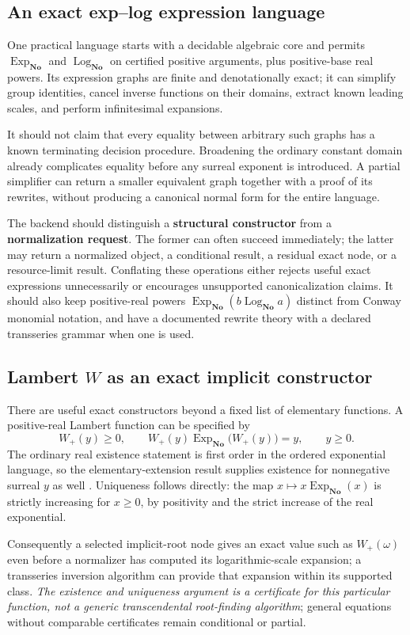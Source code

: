 \documentclass[11pt,letterpaper]{article}
\numberwithin{equation}{section}
\theoremstyle{definition}
\theoremstyle{remark}
\newcommand{\No}{\mathbf{No}}
\newcommand{\ExpNo}{\operatorname{Exp}_{\No}}
\newcommand{\LogNo}{\operatorname{Log}_{\No}}
\begin{document}
\subsection{An exact exp--log expression language}
\label{cas:sub-explog}
One practical language starts with a decidable algebraic core and permits
$\ExpNo$ and $\LogNo$ on certified positive arguments, plus positive-base real
powers. Its expression graphs are finite and denotationally exact; it can
simplify group identities, cancel inverse functions on their domains, extract
known leading scales, and perform infinitesimal expansions.

It should not claim that every equality between arbitrary such graphs has a
known terminating decision procedure. Broadening the ordinary constant domain
already complicates equality before any surreal exponent is introduced. A
partial simplifier can return a smaller equivalent graph together with a proof
of its rewrites, without producing a canonical normal form for the entire
language.

The backend should distinguish a \textbf{structural constructor} from a
\textbf{normalization request}. The former can often succeed immediately; the
latter may return a normalized object, a conditional result, a residual exact
node, or a resource-limit result. Conflating these operations either rejects
useful exact expressions unnecessarily or encourages unsupported
canonicalization claims. It should also keep positive-real powers
$\ExpNo(b\LogNo a)$ distinct from Conway monomial notation, and have a
documented rewrite theory with a declared transseries grammar when one is used.

\subsection{Lambert \texorpdfstring{$W$}{W} as an exact implicit constructor}
\label{cas:sub-lambert}
There are useful exact constructors beyond a fixed list of elementary functions.
A positive-real Lambert function can be specified by
\[
 W_+(y)\ge0,\qquad W_+(y)\ExpNo\bigl(W_+(y)\bigr)=y,\qquad y\ge0 .
\]
The ordinary real existence statement is first order in the ordered exponential
language, so the elementary-extension result supplies existence for nonnegative
surreal $y$ as well \cite{cas:vdDE}. Uniqueness follows directly: the map
$x\mapsto x\ExpNo(x)$ is strictly increasing for $x\ge0$, by positivity and the
strict increase of the real exponential.

Consequently a selected implicit-root node gives an exact value such as
$W_+(\omega)$ even before a normalizer has computed its logarithmic-scale
expansion; a transseries inversion algorithm can provide that expansion within
its supported class. \emph{The existence and uniqueness argument is a
certificate for this particular function, not a generic transcendental
root-finding algorithm}; general equations without comparable certificates
remain conditional or partial.
\end{document}
